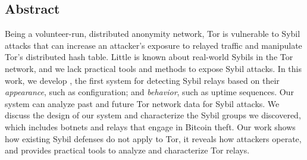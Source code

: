 \subsection*{Abstract}
Being a volunteer-run, distributed anonymity network, Tor is vulnerable to Sybil
attacks that can increase an attacker's exposure to relayed traffic and
manipulate Tor's distributed hash table.  Little is known about real-world
Sybils in the Tor network, and we lack practical tools and methods to expose
Sybil attacks.
%
In this work, we develop \sys, the first system for detecting Sybil
relays based on their \emph{appearance}, such as configuration; and
\emph{behavior}, such as uptime sequences.  Our system can analyze past and
future Tor network data for Sybil attacks.  We discuss the design of our system
and characterize the Sybil groups we discovered, which includes botnets and
relays that engage in Bitcoin theft.
%
Our work shows how existing Sybil defenses do not apply to Tor, it reveals how
attackers operate, and provides practical tools to analyze and characterize Tor
relays.
